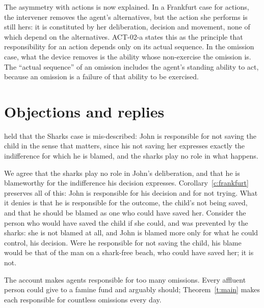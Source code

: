 \documentclass{situationist-preprint}
\begin{document}
The asymmetry with actions is now explained. In a Frankfurt case for actions, the intervener removes the agent's alternatives, but the action she performs is still hers: it is constituted by her deliberation, decision and movement, none of which depend on the alternatives. ACT-02-a states this as the principle that responsibility for an action depends only on its actual sequence. In the omission case, what the device removes is the ability whose non-exercise the omission is. The \enquote{actual sequence} of an omission includes the agent's standing ability to act, because an omission is a failure of that ability to be exercised.

\section{Objections and replies}

\begin{objection}
\citet{Frankfurt1994} held that the Sharks case is mis-described: John is responsible for not saving the child in the sense that matters, since his not saving her expresses exactly the indifference for which he is blamed, and the sharks play no role in what happens.
\end{objection}

\begin{reply}
We agree that the sharks play no role in John's deliberation, and that he is blameworthy for the indifference his decision expresses. Corollary~\ref{c:frankfurt} preserves all of this: John is responsible for his decision and for not trying. What it denies is that he is responsible for the outcome, the child's not being saved, and that he should be blamed as one who could have saved her. Consider the person who would have saved the child if she could, and was prevented by the sharks: she is not blamed at all, and John is blamed more only for what he could control, his decision. Were he responsible for not saving the child, his blame would be that of the man on a shark-free beach, who could have saved her; it is not.
\end{reply}

\begin{objection}[Overgeneration]
The account makes agents responsible for too many omissions. Every affluent person could give to a famine fund and arguably should; Theorem~\ref{t:main} makes each responsible for countless omissions every day.
\end{objection}
\end{document}
